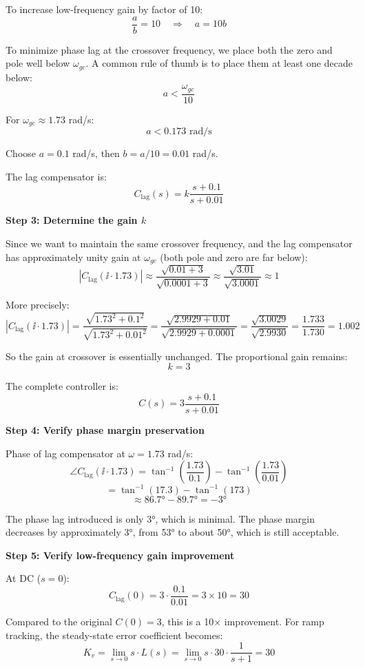 \documentclass[11pt,a4paper]{article}
\begin{document}
To increase low-frequency gain by factor of 10:
\[
\frac{a}{b} = 10 \quad \Rightarrow \quad a = 10b
\]

To minimize phase lag at the crossover frequency, we place both the zero and pole well below $\omega_{gc}$. A common rule of thumb is to place them at least one decade below:
\[
a < \frac{\omega_{gc}}{10}
\]

For $\omega_{gc} \approx 1.73$ rad/s:
\[
a < 0.173 \text{ rad/s}
\]

Choose $a = 0.1$ rad/s, then $b = a/10 = 0.01$ rad/s.

The lag compensator is:
\[
C_{\text{lag}}(s) = k\frac{s + 0.1}{s + 0.01}
\]

\textbf{Step 3: Determine the gain $k$}

Since we want to maintain the same crossover frequency, and the lag compensator has approximately unity gain at $\omega_{gc}$ (both pole and zero are far below):
\[
|C_{\text{lag}}(\ii \cdot 1.73)| \approx \frac{\sqrt{0.01 + 3}}{\sqrt{0.0001 + 3}} \approx \frac{\sqrt{3.01}}{\sqrt{3.0001}} \approx 1
\]

More precisely:
\[
|C_{\text{lag}}(\ii \cdot 1.73)| = \frac{\sqrt{1.73^2 + 0.1^2}}{\sqrt{1.73^2 + 0.01^2}} = \frac{\sqrt{2.9929 + 0.01}}{\sqrt{2.9929 + 0.0001}} = \frac{\sqrt{3.0029}}{\sqrt{2.9930}} = \frac{1.733}{1.730} = 1.002
\]

So the gain at crossover is essentially unchanged. The proportional gain remains:
\[
k = 3
\]

The complete controller is:
\[
C(s) = 3\frac{s + 0.1}{s + 0.01}
\]

\textbf{Step 4: Verify phase margin preservation}

Phase of lag compensator at $\omega = 1.73$ rad/s:
\[
\angle C_{\text{lag}}(\ii \cdot 1.73) = \tan^{-1}\left(\frac{1.73}{0.1}\right) - \tan^{-1}\left(\frac{1.73}{0.01}\right)
\]
\[
= \tan^{-1}(17.3) - \tan^{-1}(173)
\]
\[
\approx 86.7° - 89.7° = -3°
\]

The phase lag introduced is only 3°, which is minimal. The phase margin decreases by approximately 3°, from 53° to about 50°, which is still acceptable.

\textbf{Step 5: Verify low-frequency gain improvement}

At DC ($s = 0$):
\[
C_{\text{lag}}(0) = 3 \cdot \frac{0.1}{0.01} = 3 \times 10 = 30
\]

Compared to the original $C(0) = 3$, this is a 10× improvement. For ramp tracking, the steady-state error coefficient becomes:
\[
K_v = \lim_{s \to 0} s \cdot L(s) = \lim_{s \to 0} s \cdot 30 \cdot \frac{1}{s+1} = 30
\]
\end{document}
